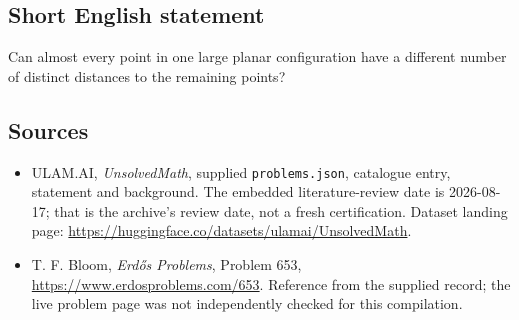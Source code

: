 \documentclass[11pt,a4paper]{article}
\begin{document}
\subsection{Short English statement}

Can almost every point in one large planar configuration have a different number of distinct distances to the remaining points?

\subsection{Sources}

{\small

\begin{itemize}

\item[\hypertarget{source:statement:1}{S1}] ULAM.AI, \emph{UnsolvedMath}, supplied \texttt{problems.json}, catalogue entry, statement and background. The embedded literature-review date is 2026-08-17; that is the archive’s review date, not a fresh certification. Dataset landing page: \url{https://huggingface.co/datasets/ulamai/UnsolvedMath}.

\item[\hypertarget{source:statement:2}{S2}] T. F. Bloom, \emph{Erdős Problems}, Problem 653, \url{https://www.erdosproblems.com/653}. Reference from the supplied record; the live problem page was not independently checked for this compilation.

\end{itemize}

}

\label{end:statement}
\end{document}
